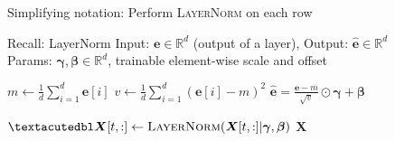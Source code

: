 \documentclass[12pt,aspectratio=169,handout]{beamer}
\begin{document}
\begin{frame}{Simplifying notation: Perform \textsc{LayerNorm} on each row}
	
	\begin{block}{Recall: LayerNorm}
		Input: $\bm{e} \in \mathbb{R}^{d}$ (output of a layer), Output: $\bm{\hat e} \in \mathbb{R}^{d}$ \\
		Params: $\bm{\gamma}, \bm{\beta} \in \mathbb{R}^{d}$, trainable element-wise scale and offset
		
		\begin{algorithmic}[1]
			\State $m \gets \frac{1}{d} \sum_{i = 1}^{d} \bm{e}[i]$
			\State $v \gets \frac{1}{d} \sum_{i = 1}^{d} (\bm{e}[i] - m)^2$
			\State \Return $\bm{\hat e} = \frac{\bm{e} - m}{\sqrt{v}} \odot \bm{\gamma} + \bm{\beta}$
			\EndFunction
		\end{algorithmic}
	\end{block}
	
	
	\begin{algorithmic}[1]
		\State $˝\bm{X}[t,:] \gets \textsc{LayerNorm}(\bm{X}{[t,:]} | \bm{\gamma}, \bm{\beta})$
		\EndFor
		\State \Return $\bm{X}$
		\EndFunction
	\end{algorithmic}
	
	
\end{frame}
\end{document}
